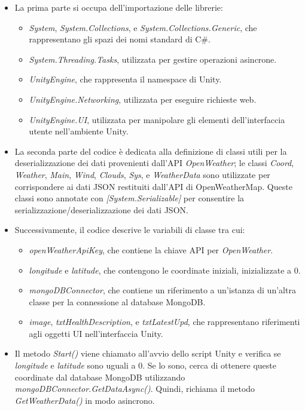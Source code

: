 \begin{itemize}
	\item La prima parte si occupa dell'importazione delle librerie:
	\begin{itemize}
		\item \textit{System}, \textit{System.Collections}, e \textit{System.Collections.Generic}, che rappresentano gli spazi dei nomi standard di C\#.
   		\item \textit{System.Threading.Tasks}, utilizzata per gestire operazioni asincrone.
   		\item \textit{UnityEngine}, che rappresenta il namespace di Unity.
   		\item \textit{UnityEngine.Networking}, utilizzata per eseguire richieste web.
   		\item \textit{UnityEngine.UI}, utilizzata per manipolare gli elementi dell'interfaccia utente nell'ambiente Unity.
	\end{itemize}
	\item La seconda parte del codice è dedicata alla definizione di classi utili per la deserializzazione dei dati provenienti dall'API \textit{OpenWeather}; le classi \textit{Coord}, \textit{Weather}, \textit{Main}, \textit{Wind}, \textit{Clouds}, \textit{Sys}, e \textit{WeatherData} sono utilizzate per corrispondere ai dati JSON restituiti dall'API di OpenWeatherMap. Queste classi sono annotate con \textit{[System.Serializable]} per consentire la serializzazione/deserializzazione dei dati JSON.
	\item Successivamente, il codice descrive le variabili di classe tra cui:
	\begin{itemize}
		\item \textit{openWeatherApiKey}, che contiene la chiave API per \textit{OpenWeather}.
   		\item \textit{longitude} e \textit{latitude}, che contengono le coordinate iniziali, inizializzate a 0.
   		\item \textit{mongoDBConnector}, che contiene un riferimento a un'istanza di un'altra classe per la connessione al database MongoDB.
   		\item \textit{image}, \textit{txtHealthDescription}, e \textit{txtLatestUpd}, che rappresentano riferimenti agli oggetti UI nell'interfaccia Unity.
	\end{itemize}
	\item Il metodo \textit{Start()} viene chiamato all'avvio dello script Unity e verifica se \textit{longitude} e \textit{latitude} sono uguali a 0. Se lo sono, cerca di ottenere queste coordinate dal database MongoDB utilizzando \textit{mongoDBConnector.GetDataAsync()}. Quindi, richiama il metodo \textit{GetWeatherData()} in modo asincrono.

\end{itemize}
